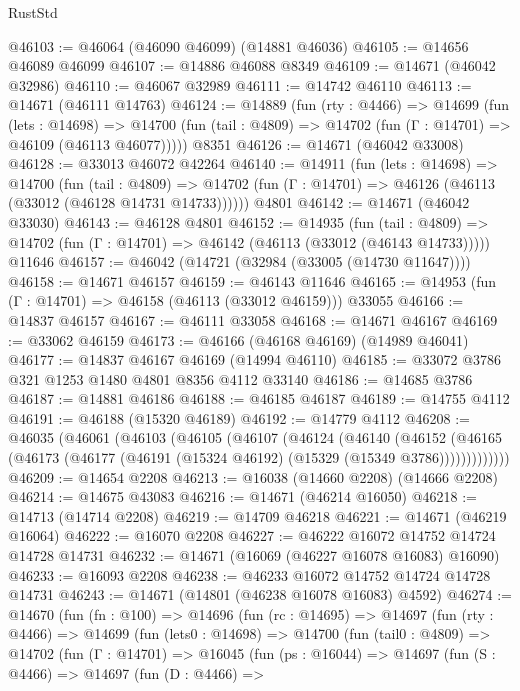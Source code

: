 \begin{lexlean}{RustStd}
\begin{coremodule}
@46103 := @46064 (@46090 @46099) (@14881 @46036)
@46105 := @14656 @46089 @46099
@46107 := @14886 @46088 @8349
@46109 := @14671 (@46042 @32986)
@46110 := @46067 @32989
@46111 := @14742 @46110
@46113 := @14671 (@46111 @14763)
@46124 := @14889
    (fun (rty : @4466) =>
    @14699
      (fun (lets : @14698) =>
      @14700 (fun (tail : @4809) => @14702 (fun (Γ : @14701) => @46109 (@46113 @46077)))))
    @8351
@46126 := @14671 (@46042 @33008)
@46128 := @33013 @46072 @42264
@46140 := @14911
    (fun (lets : @14698) =>
    @14700
      (fun (tail : @4809) =>
      @14702 (fun (Γ : @14701) => @46126 (@46113 (@33012 (@46128 @14731 @14733))))))
    @4801
@46142 := @14671 (@46042 @33030)
@46143 := @46128 @4801
@46152 := @14935
    (fun (tail : @4809) => @14702 (fun (Γ : @14701) => @46142 (@46113 (@33012 (@46143 @14733)))))
    @11646
@46157 := @46042 (@14721 (@32984 (@33005 (@14730 @11647))))
@46158 := @14671 @46157
@46159 := @46143 @11646
@46165 := @14953 (fun (Γ : @14701) => @46158 (@46113 (@33012 @46159))) @33055
@46166 := @14837 @46157
@46167 := @46111 @33058
@46168 := @14671 @46167
@46169 := @33062 @46159
@46173 := @46166 (@46168 @46169) (@14989 @46041)
@46177 := @14837 @46167 @46169 (@14994 @46110)
@46185 := @33072 @3786 @321 @1253 @1480 @4801 @8356 @4112 @33140
@46186 := @14685 @3786
@46187 := @14881 @46186
@46188 := @46185 @46187
@46189 := @14755 @4112
@46191 := @46188 (@15320 @46189)
@46192 := @14779 @4112
@46208 := @46035
    (@46061
      (@46103
        (@46105
          (@46107
            (@46124
              (@46140
                (@46152
                  (@46165 (@46173 (@46177 (@46191 (@15324 @46192) (@15329 (@15349 @3786)))))))))))))
@46209 := @14654 @2208
@46213 := @16038 (@14660 @2208) (@14666 @2208)
@46214 := @14675 @43083
@46216 := @14671 (@46214 @16050)
@46218 := @14713 (@14714 @2208)
@46219 := @14709 @46218
@46221 := @14671 (@46219 @16064)
@46222 := @16070 @2208
@46227 := @46222 @16072 @14752 @14724 @14728 @14731
@46232 := @14671 (@16069 (@46227 @16078 @16083) @16090)
@46233 := @16093 @2208
@46238 := @46233 @16072 @14752 @14724 @14728 @14731
@46243 := @14671 (@14801 (@46238 @16078 @16083) @4592)
@46274 := @14670
    (fun (fn : @100) =>
    @14696
      (fun (rc : @14695) =>
      @14697
        (fun (rty : @4466) =>
        @14699
          (fun (lets0 : @14698) =>
          @14700
            (fun (tail0 : @4809) =>
            @14702
              (fun (Γ : @14701) =>
              @16045
                (fun (ps : @16044) =>
                @14697
                  (fun (S : @4466) =>
                  @14697
                    (fun (D : @4466) =>

\end{coremodule}
\end{lexlean}
